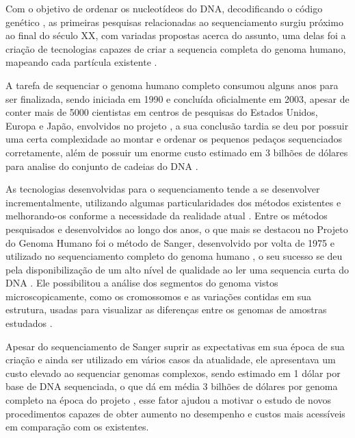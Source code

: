 Com o objetivo de ordenar os nucleotídeos do DNA, decodificando o código genético \cite{Edwards2011}, as primeiras pesquisas relacionadas ao sequenciamento surgiu próximo ao final do século XX, com variadas propostas acerca do assunto, uma delas foi a criação de tecnologias capazes de criar a sequencia completa do genoma humano, mapeando cada partícula existente \cite{Lander2001,HutchisonIII2007}. 

A tarefa de sequenciar o genoma humano completo consumou alguns anos para ser finalizada, sendo iniciada em 1990 e concluída oficialmente em 2003, apesar de conter mais de 5000 cientistas em centros de pesquisas do Estados Unidos, Europa e Japão, envolvidos no projeto \cite{HutchisonIII2007}, a sua conclusão tardia se deu por possuir uma certa complexidade ao montar e ordenar os pequenos pedaços sequenciados corretamente, além de possuir um enorme custo estimado em 3 bilhões de dólares para analise do conjunto de cadeias do DNA \cite{Rye2017,HutchisonIII2007}.

As tecnologias desenvolvidas para o sequenciamento tende a se desenvolver incrementalmente, utilizando algumas particularidades dos métodos existentes e melhorando-os conforme a necessidade da realidade atual \cite{HutchisonIII2007}. Entre os métodos pesquisados e desenvolvidos ao longo dos anos, o que mais se destacou no Projeto do Genoma Humano foi o método de Sanger, desenvolvido por volta de 1975 \cite{Sanger1975} e utilizado no sequenciamento completo do genoma humano \cite{HutchisonIII2007}, o seu sucesso se deu pela disponibilização de um alto nível de qualidade ao ler uma sequencia curta do DNA \cite{Edwards2011}. Ele possibilitou a análise dos segmentos do genoma vistos microscopicamente, como os cromossomos e as variações contidas em sua estrutura, usadas para visualizar as diferenças entre os genomas de amostras estudados \cite{Feuk2006,Sanger1975}. 

Apesar do sequenciamento de Sanger suprir as expectativas em sua época de sua criação e ainda ser utilizado em vários casos da atualidade, ele apresentava um custo elevado ao sequenciar genomas complexos, sendo estimado em 1 dólar por base de DNA sequenciada, o que dá em média 3 bilhões de dólares por genoma completo na época do projeto \cite{HutchisonIII2007}, esse fator ajudou a motivar o estudo de novos procedimentos capazes de obter aumento no desempenho e custos mais acessíveis em comparação com os existentes. 

